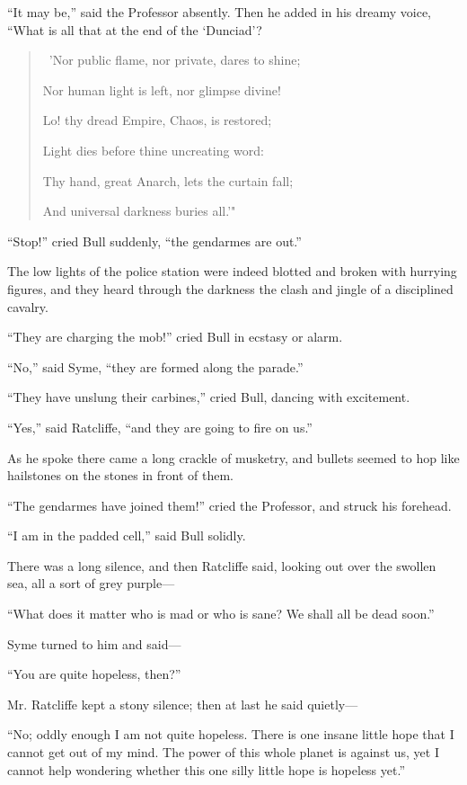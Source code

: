 \documentclass{book}
\begin{document}
“It may be,” said the Professor absently. Then he added in his dreamy voice, “What is all that at the end of the ‘Dunciad’?

\begin{quotation}\
	’Nor public flame, nor private, dares to shine;

	Nor human light is left, nor glimpse divine!

	Lo! thy dread Empire, Chaos, is restored;

	Light dies before thine uncreating word:

	Thy hand, great Anarch, lets the curtain fall;

	And universal darkness buries all.'"
\end{quotation}

“Stop!” cried Bull suddenly, “the gendarmes are out.”

The low lights of the police station were indeed blotted and broken with hurrying figures, and they heard through the darkness the clash and jingle of a disciplined cavalry.

“They are charging the mob!” cried Bull in ecstasy or alarm.

“No,” said Syme, “they are formed along the parade.”

“They have unslung their carbines,” cried Bull, dancing with excitement.

“Yes,” said Ratcliffe, “and they are going to fire on us.”

As he spoke there came a long crackle of musketry, and bullets seemed to hop like hailstones on the stones in front of them.

“The gendarmes have joined them!” cried the Professor, and struck his forehead.

“I am in the padded cell,” said Bull solidly.

There was a long silence, and then Ratcliffe said, looking out over the swollen sea, all a sort of grey purple—

“What does it matter who is mad or who is sane? We shall all be dead soon.”

Syme turned to him and said—

“You are quite hopeless, then?”

Mr. Ratcliffe kept a stony silence; then at last he said quietly—

“No; oddly enough I am not quite hopeless. There is one insane little hope that I cannot get out of my mind. The power of this whole planet is against us, yet I cannot help wondering whether this one silly little hope is hopeless yet.”
\end{document}
